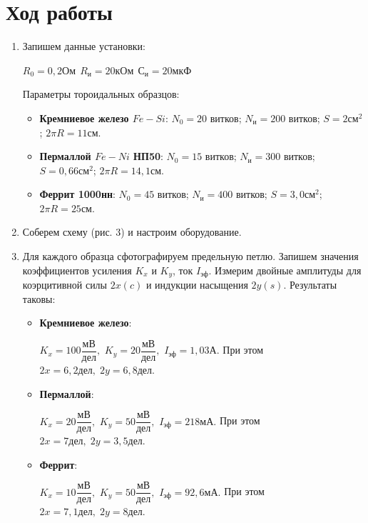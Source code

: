 \documentclass[12pt]{kiarticle} %
\begin{document}
  	
  	\section{Ход работы}
  	
  	\begin{enumerate}
  	\item Запишем данные установки:
  	
  	$R_{0}=0,2 Ом \ \ R_{и}=20 кОм \ \ С_{и}=20 мкФ $
  	
  	Параметры тороидальных образцов:
  	
  \begin{itemize}
  	\item 	\textbf{Кремниевое железо $ Fe-Si $}: 
  	$N_{0}=20$ витков;
  	$N_{и}=200$ витков;
  	$S=2 см^{2}$;
  	$2\pi R = 11 см $. 
  	
  \item	\textbf{Пермаллой $ Fe-Ni $  НП50}: $N_{0}=15$ витков;
  	$N_{и}=300$ витков;
  	$S=0,66 см^{2}$;
  	$2\pi R = 14,1 см $.  
  	
  \item	\textbf{Феррит 1000нн}: $N_{0}=45$ витков;
  			$N_{и}=400$ витков;
  			$S=3,0 см^{2}$;
  			$2\pi R = 25 см $.  
  \end{itemize}
  
  	 
  	\item Соберем схему (рис. 3) и настроим оборудование. 	
 
 	\item Для каждого образца сфотографируем предельную петлю. Запишем значения коэффициентов усиления $K_{x}$ и $K_{y}$, ток $I_{эф}$. Измерим двойные амплитуды для коэрцитивной силы $2x(c)$ и индукции насыщения $2y(s)$. Результаты таковы:
 	
 	 \begin{itemize}
 	 	\item 	\textbf{Кремниевое железо}:
 	
 	$K_{x}=100 \dfrac{мВ}{дел},$
 	$K_{y}=20 \dfrac{мВ}{дел},$
 	$I_{эф}=1,03 А. $
 	При этом $ 2x = 6,2 дел, \; 2y = 6,8 дел$.
 	
 \item 	\textbf{Пермаллой}:
 	
 	$K_{x}=20 \dfrac{мВ}{дел},$
 	$K_{y}=50 \dfrac{мВ}{дел},$
 	$I_{эф}=218 мА. $
 	При этом $ 2x = 7 дел, \; 2y = 3,5 дел$.
 	
 \item 	 \textbf{Феррит}:
 	 
 $K_{x}=10 \dfrac{мВ}{дел},$
 $K_{y}=50 \dfrac{мВ}{дел},$
 $I_{эф}=92,6 мА. $
 При этом $ 2x = 7,1 дел, \; 2y = 8 дел$.
  	

\end{itemize}
\end{enumerate}
\end{document}
